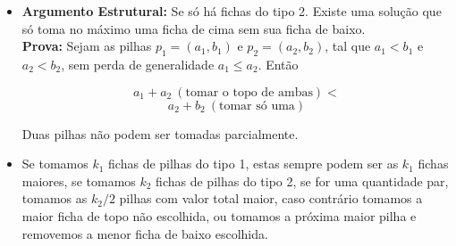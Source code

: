 \documentclass[12pt]{beamer}
\begin{document}
\begin{frame}
\begin{bloco}

\begin{itemize}
    \item \textbf{Argumento Estrutural:} Se só há fichas do tipo 2. Existe uma solução que só toma no máximo uma ficha de cima sem sua ficha de baixo.\\
    \pause
    \textbf{Prova:} Sejam as pilhas $p_1 = (a_1, b_1)$ e $p_2 = (a_2, b_2)$, tal que $a_1 < b_1$ e $a_2 < b_2$, sem perda de generalidade $a_1 \le a_2$. Então

\[
    a_1 + a_2 ~(\text{tomar o topo de ambas}) < 
\]
\[
    a_2 + b_2 ~(\text{tomar só uma})
\]

    Duas pilhas não podem ser tomadas parcialmente.

\end{itemize}

\end{bloco}
\end{frame}

\begin{frame}
\begin{bloco}

\begin{itemize}
    
    \item Se tomamos $k_1$ fichas de pilhas do tipo 1, estas sempre podem ser as $k_1$ fichas maiores, se tomamos $k_2$ fichas de pilhas do tipo 2, se for uma quantidade par, tomamos as $k_2 / 2$ pilhas com valor total maior, caso contrário tomamos a maior ficha de topo não escolhida, ou tomamos a próxima maior pilha e removemos a menor ficha de baixo escolhida.   
    
\end{itemize}

\end{bloco}
\end{frame}
\end{document}
